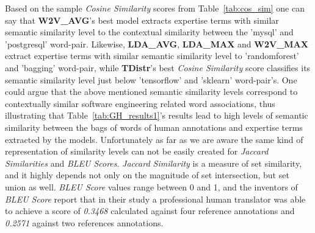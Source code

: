          \begin{table}
              \centering
              \caption{Example of Cosine Similarity Scores between Word-Pairs} \label{tab:cos_sim}
                \vspace{6pt} %
        \end{table}
            
        Based on the sample \emph{Cosine Similarity} scores from Table~\ref{tab:cos_sim} one can say that \textbf{W2V\_AVG}'s best model extracts expertise terms with similar semantic similarity level to the contextual similarity between the 'mysql' and 'postgresql' word-pair. Likewise, \textbf{LDA\_AVG}, \textbf{LDA\_MAX} and \textbf{W2V\_MAX} extract expertise terms with similar semantic similarity level to 'randomforest' and 'bagging' word-pair, while \textbf{TDistr}'s best \emph{Cosine Similarity} score classifies its semantic similarity level just below 'tensorflow' and 'sklearn' word-pair's. One could argue that the above mentioned semantic similarity levels correspond to contextually similar software engineering related word associations, thus illustrating that Table~\ref{tab:GH_results1}'s results lead to high levels of semantic similarity between the bags of words of human annotations and expertise terms extracted by the models. Unfortunately as far as we are aware the same kind of representation of similarity levels can not be easily created for \emph{Jaccard Similarities} and \emph{BLEU Scores}. \emph{Jaccard Similarity} is a measure of set similarity, and it highly depends not only on the magnitude of set intersection, but set union as well. \emph{BLEU Score} values range between 0 and 1, and the inventors of \emph{BLEU Score} report that in their study a professional human translator was able to achieve a score of \emph{0.3468} calculated against four reference annotations and \emph{0.2571} against two references annotations\cite{papineni2002bleu}.
        
